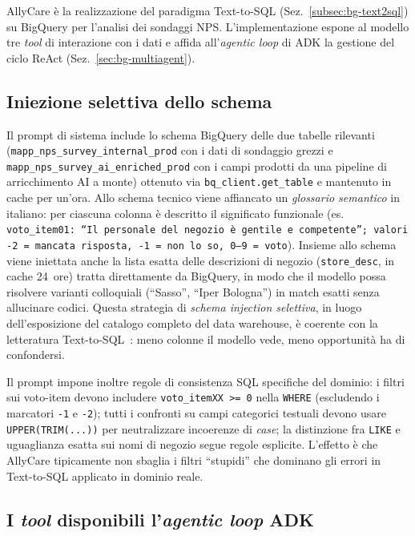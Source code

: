 AllyCare è la realizzazione del paradigma Text-to-SQL (Sez.~\ref{subsec:bg-text2sql}) su BigQuery per
l'analisi dei sondaggi NPS. L'implementazione
espone al modello tre \emph{tool} di
interazione con i dati e affida all'\emph{agentic loop} di ADK la
gestione del ciclo ReAct (Sez.~\ref{sec:bg-multiagent}).

\subsection{Iniezione selettiva dello schema}
\label{subsec:allycare-schema}

Il prompt di sistema include lo schema BigQuery delle due tabelle
rilevanti (\texttt{mapp\_nps\_survey\_internal\_prod} con i dati di
sondaggio grezzi e \texttt{mapp\_nps\_survey\_ai\_enriched\_prod} con i
campi prodotti da una pipeline di arricchimento AI a monte) ottenuto via
\texttt{bq\_client.get\_table} e mantenuto in cache per un'ora. Allo
schema tecnico viene affiancato un \emph{glossario semantico} in
italiano: per ciascuna colonna è descritto il significato funzionale
(es. \texttt{voto\_item01: ``Il personale del negozio è gentile e
competente''; valori -2 = mancata risposta, -1 = non lo so, 0--9 = voto}).
Insieme allo schema viene iniettata anche la lista esatta delle
descrizioni di negozio (\texttt{store\_desc}, in cache 24~ore) tratta
direttamente da BigQuery, in modo che il modello possa risolvere
varianti colloquiali (``Sasso'', ``Iper Bologna'') in match esatti senza
allucinare codici. Questa strategia di \emph{schema injection
selettiva}, in luogo dell'esposizione del catalogo completo del data
warehouse, è coerente con la letteratura
Text-to-SQL~\cite{pourreza2023dinsql}: meno colonne il modello vede,
meno opportunità ha di confondersi.

Il prompt impone inoltre regole di consistenza SQL specifiche del
dominio: i filtri sui voto-item devono includere \texttt{voto\_itemXX
>= 0} nella \texttt{WHERE} (escludendo i marcatori \texttt{-1} e
\texttt{-2}); tutti i confronti su campi categorici testuali devono
usare \texttt{UPPER(TRIM(...))} per neutralizzare incoerenze di
\emph{case}; la distinzione fra \texttt{LIKE} e uguaglianza esatta
sui nomi di negozio segue regole esplicite. L'effetto è che AllyCare
tipicamente non sbaglia i filtri ``stupidi'' che dominano gli errori in
Text-to-SQL applicato in dominio reale.

\subsection{I \emph{tool} disponibili l'\emph{agentic loop} ADK}
\label{subsec:allycare-tools}

